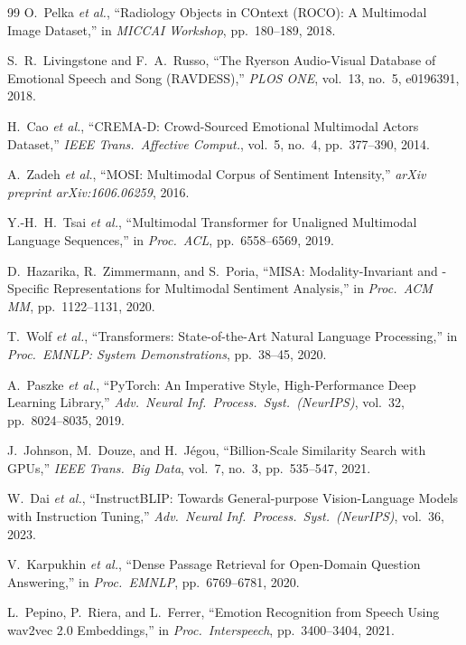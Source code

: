 \documentclass[10pt,conference]{IEEEtran}
\theoremstyle{ieeethm}
\theoremstyle{ieeedef}
\theoremstyle{ieeeremark}
\begin{document}
\begin{thebibliography}{99}
O.~Pelka \textit{et al.},
``Radiology Objects in COntext (ROCO): A Multimodal Image Dataset,''
in \textit{MICCAI Workshop}, pp.~180--189, 2018.

S.~R.~Livingstone and F.~A.~Russo,
``The Ryerson Audio-Visual Database of Emotional Speech and Song (RAVDESS),''
\textit{PLOS ONE}, vol.~13, no.~5, e0196391, 2018.

H.~Cao \textit{et al.},
``CREMA-D: Crowd-Sourced Emotional Multimodal Actors Dataset,''
\textit{IEEE Trans.\ Affective Comput.}, vol.~5, no.~4, pp.~377--390, 2014.

A.~Zadeh \textit{et al.},
``MOSI: Multimodal Corpus of Sentiment Intensity,''
\textit{arXiv preprint arXiv:1606.06259}, 2016.

Y.-H.~H.~Tsai \textit{et al.},
``Multimodal Transformer for Unaligned Multimodal Language Sequences,''
in \textit{Proc.\ ACL}, pp.~6558--6569, 2019.

D.~Hazarika, R.~Zimmermann, and S.~Poria,
``MISA: Modality-Invariant and -Specific Representations for Multimodal Sentiment Analysis,''
in \textit{Proc.\ ACM MM}, pp.~1122--1131, 2020.

T.~Wolf \textit{et al.},
``Transformers: State-of-the-Art Natural Language Processing,''
in \textit{Proc.\ EMNLP: System Demonstrations}, pp.~38--45, 2020.

A.~Paszke \textit{et al.},
``PyTorch: An Imperative Style, High-Performance Deep Learning Library,''
\textit{Adv.\ Neural Inf.\ Process.\ Syst.\ (NeurIPS)}, vol.~32, pp.~8024--8035, 2019.

J.~Johnson, M.~Douze, and H.~J\'{e}gou,
``Billion-Scale Similarity Search with GPUs,''
\textit{IEEE Trans.\ Big Data}, vol.~7, no.~3, pp.~535--547, 2021.

W.~Dai \textit{et al.},
``InstructBLIP: Towards General-purpose Vision-Language Models with Instruction Tuning,''
\textit{Adv.\ Neural Inf.\ Process.\ Syst.\ (NeurIPS)}, vol.~36, 2023.

V.~Karpukhin \textit{et al.},
``Dense Passage Retrieval for Open-Domain Question Answering,''
in \textit{Proc.\ EMNLP}, pp.~6769--6781, 2020.

L.~Pepino, P.~Riera, and L.~Ferrer,
``Emotion Recognition from Speech Using wav2vec 2.0 Embeddings,''
in \textit{Proc.\ Interspeech}, pp.~3400--3404, 2021.


\end{thebibliography}
\end{document}
